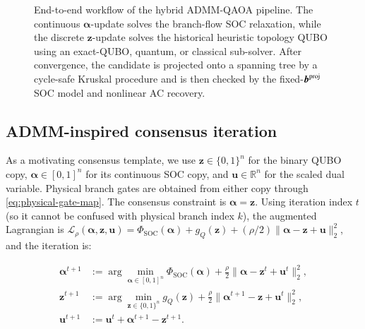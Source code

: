 \documentclass[5p,twocolumn,number,sort&compress,nopreprintline]{elsarticle}
\begin{document}
\begin{figure}[t]
{
}
\caption{End-to-end workflow of the hybrid ADMM-QAOA pipeline. The
continuous $\boldsymbol\alpha$-update solves the branch-flow SOC relaxation,
while the discrete
$\boldsymbol z$-update solves the historical heuristic topology QUBO using an exact-QUBO,
quantum, or classical sub-solver. After convergence, the candidate is
projected onto a spanning tree by a cycle-safe Kruskal procedure and is
then checked by the fixed-$\boldsymbol b^{\rm proj}$ SOC model and
nonlinear AC recovery.}
\label{fig:pipeline-workflow}
\end{figure}

\subsection{ADMM-inspired consensus iteration}
\label{sec:admm}
As a motivating consensus template, we use
$\boldsymbol z\in\{0,1\}^n$ for the binary QUBO copy,
$\boldsymbol\alpha\in[0,1]^n$ for its continuous SOC copy, and
$\boldsymbol u\in\mathbb R^n$ for the scaled dual variable. Physical
branch gates are obtained from either copy through
\eqref{eq:physical-gate-map}. The consensus constraint is
$\boldsymbol\alpha=\boldsymbol z$. Using iteration index $t$ (so it
cannot be confused with physical branch index $k$), the augmented
Lagrangian is
$\mathcal L_\rho(\boldsymbol\alpha,\boldsymbol z,\boldsymbol u)
=\Phi_{\mathrm{SOC}}(\boldsymbol\alpha)+g_Q(\boldsymbol z)
+(\rho/2)\|\boldsymbol\alpha-\boldsymbol z+\boldsymbol u\|_2^2$,
and the iteration is:

\begin{subequations}\label{eq:admm}
\begin{align}
\boldsymbol\alpha^{t+1} &:={}
\arg\min_{\boldsymbol\alpha\in[0,1]^n}
\Phi_{\mathrm{SOC}}(\boldsymbol\alpha)
+\tfrac{\rho}{2}
\|\boldsymbol\alpha-\boldsymbol z^t+\boldsymbol u^t\|_2^2,
\label{eq:admm-x}\\
\boldsymbol z^{t+1} &:={}
\arg\min_{\boldsymbol z\in\{0,1\}^n}g_Q(\boldsymbol z)
+\tfrac{\rho}{2}
\|\boldsymbol\alpha^{t+1}-\boldsymbol z+\boldsymbol u^t\|_2^2,
\label{eq:admm-z}\\
\boldsymbol u^{t+1} &:={}
\boldsymbol u^t+\boldsymbol\alpha^{t+1}-\boldsymbol z^{t+1}.
\label{eq:admm-y}
\end{align}
\end{subequations}
\end{document}

